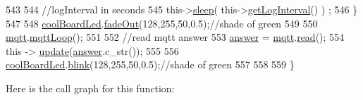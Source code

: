 \begin{DoxyCode}
543 
544         \textcolor{comment}{//logInterval in seconds}
545         this->\hyperlink{class_cool_board_a069952cdcb2e7f68518aa429eceadb6e}{sleep}( this->\hyperlink{class_cool_board_a7508e029f2ee17bb747ffab599285e0d}{getLogInterval}() ) ;
546     \}
547 
548     \hyperlink{class_cool_board_a1b1d3c684a5baa56b08486e192fd8e97}{coolBoardLed}.\hyperlink{class_cool_board_led_a93d545679237e8cc858324367149775c}{fadeOut}(128,255,50,0.5);\textcolor{comment}{//shade of green        }
549 
550     \hyperlink{class_cool_board_a2399f44d7c23c1149a335cb3b46d90f1}{mqtt}.\hyperlink{class_cool_m_q_t_t_aa5eaae967b562b62cbcf2b8d81f6e5d5}{mqttLoop}();
551 
552     \textcolor{comment}{//read mqtt answer}
553     \hyperlink{class_cool_board_a7b835fafd449e5282f7f91d787a2dc15}{answer} = \hyperlink{class_cool_board_a2399f44d7c23c1149a335cb3b46d90f1}{mqtt}.\hyperlink{class_cool_m_q_t_t_ae3c18f6ae9723746d32765f1c8f176ca}{read}();
554     \textcolor{keyword}{this} -> \hyperlink{class_cool_board_a8612756d3f73198cdde857a66f0fe690}{update}(\hyperlink{class_cool_board_a7b835fafd449e5282f7f91d787a2dc15}{answer}.c\_str()); 
555 
556     \hyperlink{class_cool_board_a1b1d3c684a5baa56b08486e192fd8e97}{coolBoardLed}.\hyperlink{class_cool_board_led_a96e1ea13003eee34c9dbcef340404426}{blink}(128,255,50,0.5);\textcolor{comment}{//shade of green    }
557 
558 
559 \}
\end{DoxyCode}
Here is the call graph for this function\+:
\nopagebreak
